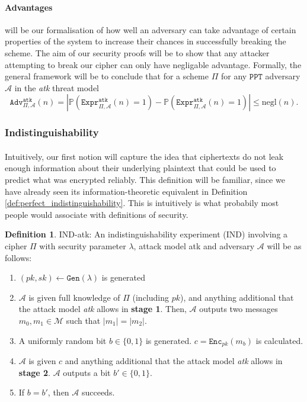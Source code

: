 \documentclass{article}
\theoremstyle{definition}
\newtheorem{definition}{Definition}[section]
\newcommand{\Enc}{\texttt{Enc}}
\newcommand{\Gen}{\texttt{Gen}}
\newcommand{\M}{\mathcal{M}}
\newcommand{\A}{\mathcal{A}}
\newcommand{\Prob}{\mathbb{P}}
\newcommand{\PPT}{\texttt{PPT}}
\newcommand{\negl}{\text{negl}}
\newcommand{\Expr}[2]{\texttt{Expr}^{\texttt{#1}}_{#2}}
\newcommand{\Adv}[2]{\texttt{Adv}^{\texttt{#1}}_{#2}}
\begin{document}
\paragraph{Advantages} will be our formalisation of how well an adversary can
take advantage of certain properties of the system to increase their chances in
successfully breaking the scheme. The aim of our security proofs will be to show
that any attacker attempting to break our cipher can only have negligable
advantage. Formally, the general framework will be to conclude that for a scheme
$\Pi$ for any $\PPT$ adversary $\A$ in the \textit{atk} threat model
\[
  \Adv{atk}{\Pi, \A}(n) = |\Prob(\Expr{atk}{\Pi, \A}(n) = 1) - \Prob(\Expr{atk}{\Pi,
    \A}(n) = 1)| \leq \negl(n).
\]
\subsubsection{Indistinguishability}
\paragraph{} Intuitively, our first notion will capture the idea that
ciphertexts do not leak enough information about their underlying plaintext that
could be used to predict what was encrypted reliably. This definition will be
familiar, since we have already seen its information-theoretic equivalent in
Definition \ref{def:perfect_indistinguishability}. This is intuitively is what probabily
most people would associate with definitions of security.
\begin{definition}{IND-atk:}
  An indistinguishability experiment (IND) involving a cipher $\Pi$ with
  security parameter $\lambda$, attack model atk and adversary $\A$ will be as follows:
  \begin{enumerate}
  \item $(pk, sk) \leftarrow \Gen(\lambda)$ is generated
  \item $\A$ is given full knowledge of $\Pi$ (including $pk$), and anything additional that the
    attack model \textit{atk} allows in \textbf{stage 1}. Then, $\A$ outputs two messages
    $m_0, m_1 \in \M$ such that $|m_1| = |m_2|$.
  \item A uniformly random bit $b \in \{0, 1\}$ is generated. $c = \Enc_{pk}(m_b)$ is calculated.
  \item $\A$ is given $c$ and anything additional that the attack model
    \textit{atk} allows in \textbf{stage 2}. $\A$ outputs a bit $b' \in \{0,
    1\}$.
  \item If $b = b'$, then $\A$ succeeds.
  \end{enumerate}
\end{definition}
\end{document}
